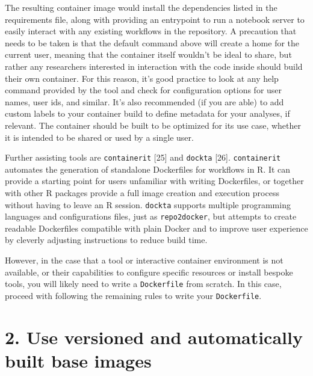 \documentclass[10pt,letterpaper]{article}
\begin{document}
The resulting container image would install the dependencies listed in
the requirements file, along with providing an entrypoint to run a
notebook server to easily interact with any existing workflows in the
repository. A precaution that needs to be taken is that the default
command above will create a home for the current user, meaning that the
container itself wouldn't be ideal to share, but rather any researchers
interested in interaction with the code inside should build their own
container. For this reason, it's good practice to look at any help
command provided by the tool and check for configuration options for
user names, user ids, and similar. It's also recommended (if you are
able) to add custom labels to your container build to define metadata
for your analyses, if relevant. The container should be built to be
optimized for its use case, whether it is intended to be shared or used
by a single user.

Further assisting tools are \texttt{containerit} {[}25{]} and
\texttt{dockta} {[}26{]}. \texttt{containerit} automates the generation
of standalone Dockerfiles for workflows in R. It can provide a starting
point for users unfamiliar with writing Dockerfiles, or together with
other R packages provide a full image creation and execution process
without having to leave an R session. \texttt{dockta} supports multiple
programming languages and configurations files, just as
\texttt{repo2docker}, but attempts to create readable Dockerfiles
compatible with plain Docker and to improve user experience by cleverly
adjusting instructions to reduce build time.

However, in the case that a tool or interactive container environment is
not available, or their capabilities to configure specific resources or
install bespoke tools, you will likely need to write a
\texttt{Dockerfile} from scratch. In this case, proceed with following
the remaining rules to write your \texttt{Dockerfile}.

\hypertarget{use-versioned-and-automatically-built-base-images}{%
\section*{2. Use versioned and automatically built base
images}\label{use-versioned-and-automatically-built-base-images}}
\end{document}
